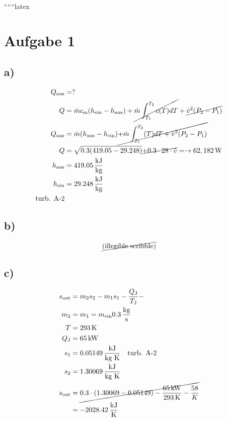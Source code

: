 
``````latex


\section*{Aufgabe 1}

\subsection*{a)}
\begin{align*}
Q_{\text{aus}} &= ? \\
Q &= \dot{m} c_{\text{m}} (h_{\text{ein}} - h_{\text{aus}}) + \cancel{\dot{m} \int_{T_1}^{T_2} c(T) dT} + \cancel{\dot{v}^2 (P_2 - P_1)} \\
Q_{\text{aus}} &= \dot{m} (h_{\text{aus}} - h_{\text{ein}}) \cancel{+ \dot{m} \int_{T_1}^{T_2} (T) dT + \dot{v}^2 (P_2 - P_1)} \\
Q &= \sqrt{0.3 (419.05 - 29.248)} \cancel{+ 0.3 \cdot 28 \cdot \dot{v}} = \rightarrow 62,182 \, \text{W} \\
h_{\text{aus}} &= 419.05 \, \frac{\text{kJ}}{\text{kg}} \\
h_{\text{ein}} &= 29.248 \, \frac{\text{kJ}}{\text{kg}} \\
\text{turb. A-2}
\end{align*}

\subsection*{b)}
\begin{align*}
\cancel{\text{(illegible scribble)}}
\end{align*}

\subsection*{c)}
\begin{align*}
s_{\text{out}} &= m_2 s_2 - m_1 s_1 - \frac{Q_{\text{J}}}{T_{\text{J}}} - \\
m_2 &= m_1 = m_{\text{ein}} 0.3 \, \frac{\text{kg}}{\text{s}} \\
T &= 293 \, \text{K} \\
Q_{\text{J}} &= 65 \, \text{kW} \\
s_1 &= 0.05149 \, \frac{\text{kJ}}{\text{kg K}} \quad \text{turb. A-2} \\
s_2 &= 1.30069 \, \frac{\text{kJ}}{\text{kg K}} \\
s_{\text{out}} &= \cancel{0.3 \cdot (1.30069 - 0.05149) - \frac{65 \, \text{kW}}{293 \, \text{K}} - \frac{58}{K}} \\
&= -2028.42 \, \frac{\text{kJ}}{\text{K}}
\end{align*}

